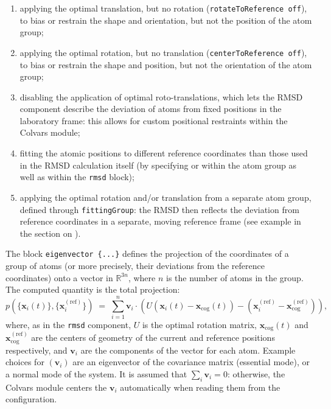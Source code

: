 \begin{enumerate}
\item applying the optimal translation, but no rotation
(\texttt{rotateToReference off}), to bias or restrain the shape and
orientation, but not the position of the atom group;
\item applying the optimal rotation, but no translation
(\texttt{centerToReference off}), to bias or restrain the shape and
position, but not the orientation of the atom group;
\item disabling the application of optimal roto-translations, which
lets the RMSD component describe the deviation of atoms
from fixed positions in the laboratory frame: this allows for custom
positional restraints within the Colvars module;
\item fitting the atomic positions to different reference coordinates
than those used in the RMSD calculation itself
(by specifying  or 
within the atom group as well as within the \texttt{rmsd} block);
\item applying the optimal rotation and/or translation from a separate
atom group, defined through \texttt{fittingGroup}:
the RMSD then reflects the deviation from reference coordinates in a separate, moving
reference frame (see example in the section on ).
\end{enumerate}




The block \texttt{eigenvector~\{...\}} defines the projection of the coordinates
of a group of atoms (or more precisely, their deviations from the
reference coordinates) onto a vector in $\mathbb{R}^{3n}$, where $n$ is the
number of atoms in the group. The computed quantity is the
total projection:
\begin{equation}
  \label{eq:cvc_eigenvector}
  { p(\{\mathbf{x}_{i}(t)\},
    \{\mathbf{x}_{i}^{\mathrm{(ref)}}\}) } \; = \; {
    \sum_{i=1}^{n}  \mathbf{v}_{i} \cdot
    \left(U(\mathbf{x}_{i}(t) - \mathbf{x}_{\mathrm{cog}}(t)) -
      (\mathbf{x}_{i}^{\mathrm{(ref)}} -
      \mathbf{x}_{\mathrm{cog}}^{\mathrm{(ref)}}) \right)\mathrm{,} }
\end{equation}
where, as in the \texttt{rmsd} component, $U$ is the optimal rotation
matrix, $\mathbf{x}_{\mathrm{cog}}(t)$ and
$\mathbf{x}_{\mathrm{cog}}^{\mathrm{(ref)}}$ are the centers of
geometry of the current and reference positions respectively, and
$\mathbf{v}_{i}$ are the components of the vector for each atom.
Example choices for $(\mathbf{v}_{i})$ are an eigenvector
of the covariance matrix (essential mode), or a normal
mode of the system.  It is assumed that $\sum_{i}\mathbf{v}_{i} = 0$:
otherwise, the Colvars module centers the $\mathbf{v}_{i}$
automatically when reading them from the configuration.

